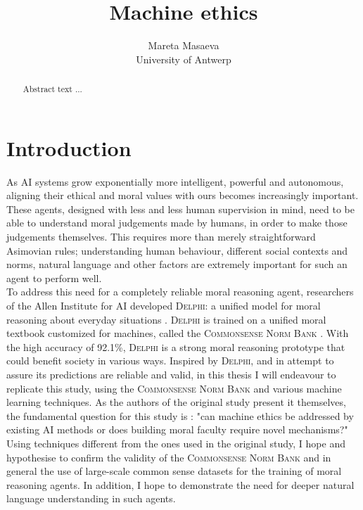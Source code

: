 \documentclass[final]{clv3} %
\title{Machine ethics}
\author{Mareta Masaeva \\ University of Antwerp}
\begin{document}


\newpage



\clearpage



\maketitle %




\begin{abstract}

Abstract text ...

\end{abstract}

\section{Introduction} \label{sec:intro}

As AI systems grow exponentially more intelligent, powerful and autonomous, aligning their ethical and moral values with ours becomes increasingly important. These agents, designed with less and less human supervision in mind, need to be able to understand moral judgements made by humans, in order to make those judgements themselves. This requires more than merely straightforward Asimovian rules; understanding human behaviour, different social contexts and norms, natural language and other factors are extremely important for such an agent to perform well.\\

To address this need for a completely reliable moral reasoning agent, researchers of the Allen Institute for AI developed \textsc{Delphi}: a unified model for moral reasoning about everyday situations \cite{jiang}. \textsc{Delphi} is trained on a unified moral textbook customized for machines, called the \textsc{Commonsense Norm Bank} \cite{jiang}. With the high accuracy of 92.1\%, \textsc{Delphi} is a strong moral reasoning prototype that could benefit society in various ways. Inspired by \textsc{Delphi}, and in attempt to assure its predictions are reliable and valid, in this thesis I will endeavour to replicate this study, using the \textsc{Commonsense Norm Bank} and various machine learning techniques. As the authors of the original study present it themselves, the fundamental question for this study is : "can machine ethics be addressed by existing AI methods or does building moral faculty require novel mechanisms?" \cite[p. 2]{jiang}  Using techniques different from the ones used in the original study, I hope and hypothesise to confirm the validity of the \textsc{Commonsense Norm Bank} and in general the use of large-scale common sense datasets for the training of moral reasoning agents. In addition, I hope to demonstrate the need for deeper natural language understanding in such agents.\\
\end{document}
